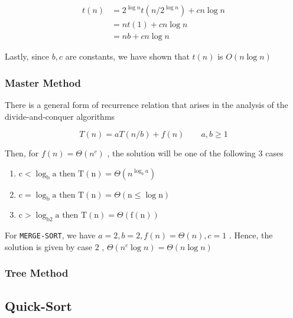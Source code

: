 \begin{align*}
	t(n) &= 2^{\log n} t(n/2^{\log n}) + cn\log n \\
		&= nt(1) + cn\log n \\
		&= nb + cn\log n
\end{align*}

\par{Lastly, since $b,c$ are constants, we have shown that $t(n)$ is $O(n\log
n)$}

\subsubsection{Master Method}

	\par{There is a general form of recurrence relation that arises in the
analysis of the divide-and-conquer algorithms}

$$T(n) = aT(n/b) + f(n) \qquad a , b \geq 1$$

	\par{Then, for $f(n) = \Theta(n^c)$ , the solution will be one of the
following 3 cases}

	\begin{enumerate}
		\item $
\mathrm{c}<\log _{\mathrm{b}} \mathrm{a} \text { then } \mathrm{T}(\mathrm{n})=\Theta\left(n^{\log _{b} a}\right)
$
		\item $
\mathrm{c}=\log _{\mathrm{b}} \mathrm{a} \text { then } \mathrm{T}(\mathrm{n})=\Theta(\mathrm{n} \leq \log \mathrm{n})
$
		\item $
\mathrm{c}>\log _{\mathrm{b} 2} \mathrm{a} \text { then } \mathrm{T}(\mathrm{n})=\Theta(\mathrm{f}(\mathrm{n}))
$
	\end{enumerate}

\par{For \texttt{MERGE-SORT}, we have $a=2 , b=2 , f(n) = \Theta(n) , c = 1$ .
Hence, the solution is given by case $2$ , $\Theta(n^c \log n) = \Theta(n \log
n)$}

\subsubsection{Tree Method}



\subsection{Quick-Sort}

